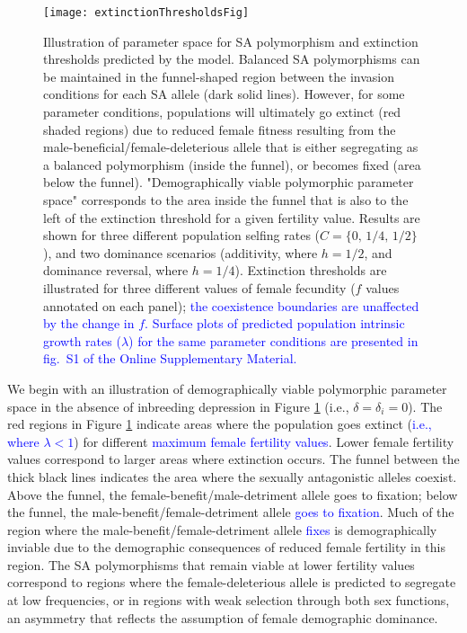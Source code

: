 \documentclass[11pt]{article}
\begin{document}
 \begin{figure}[htbp]
 \centering
 \texttt{[image: extinctionThresholdsFig]}
 \caption{\footnotesize{Illustration of parameter space for SA polymorphism and extinction thresholds predicted by the model. Balanced SA polymorphisms can be maintained in the funnel-shaped region between the invasion conditions for each SA allele (dark solid lines). However, for some parameter conditions, populations will ultimately go extinct (red shaded regions) due to reduced female fitness resulting from the male-beneficial/female-deleterious allele that is either segregating as a balanced polymorphism (inside the funnel), or becomes fixed (area below the funnel). "Demographically viable polymorphic parameter space" corresponds to the area inside the funnel that is also to the left of the extinction threshold for a given fertility value. Results are shown for three different population selfing rates ($C = \{0,\,1/4,\,1/2\}$), and two dominance scenarios (additivity, where $h = 1/2$, and dominance reversal, where $h = 1/4$). Extinction thresholds are illustrated for three different values of female fecundity ($f$ values annotated on each panel); \textcolor{blue}{ the coexistence boundaries are unaffected by the change in $f$.} \textcolor{blue}{Surface plots of predicted population intrinsic growth rates ($\lambda$) for the same parameter conditions are presented in fig.~S1 of the Online Supplementary Material.}}}
 \label{fig:extThresholds}
 \end{figure}

We begin with an illustration of demographically viable polymorphic parameter space in the absence of inbreeding depression in Figure \ref{fig:extThresholds} (i.e., $\delta = \delta_i = 0$). The red regions in Figure \ref{fig:extThresholds} indicate areas where the population goes extinct (\textcolor{blue}{i.e., where $\lambda < 1$}) for different \textcolor{blue}{maximum female fertility values}. Lower female fertility values correspond to larger areas where extinction occurs. The funnel between the thick black lines indicates the area where the sexually antagonistic alleles coexist. Above the funnel, the female-benefit/male-detriment allele goes to fixation; below the funnel, the male-benefit/female-detriment allele \textcolor{blue}{goes to fixation}. Much of the region where the male-benefit/female-detriment allele \textcolor{blue}{fixes} is demographically inviable due to the demographic consequences of reduced female fertility in this region. The SA polymorphisms that remain viable at lower fertility values correspond to regions where the female-deleterious allele is predicted to segregate at low frequencies, or in regions with weak selection through both sex functions, an asymmetry that reflects the assumption of female demographic dominance.
\end{document}
